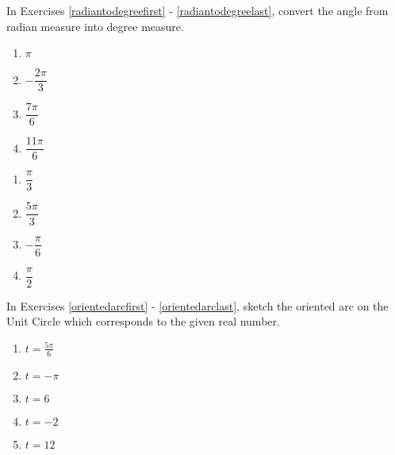 In Exercises \ref{radiantodegreefirst} - \ref{radiantodegreelast}, convert the angle from radian measure into degree measure.

\begin{multicols}{4} 

\begin{enumerate}

\setcounter{enumi}{\value{HW}}

\item $\pi$  \label{radiantodegreefirst}
\item $-\dfrac{2\pi}{3}$
\item $\dfrac{7\pi}{6}$
\item $\dfrac{11\pi}{6}$

\setcounter{HW}{\value{enumi}}

\end{enumerate}

\end{multicols}

\begin{multicols}{4} 

\begin{enumerate}

\setcounter{enumi}{\value{HW}}

\item $\dfrac{\pi}{3}$ 
\item $\dfrac{5\pi}{3}$
\item $-\dfrac{\pi}{6}$ 
\item $\dfrac{\pi}{2}$  \label{radiantodegreelast}

\setcounter{HW}{\value{enumi}}

\end{enumerate}

\end{multicols}


In Exercises \ref{orientedarcfirst} - \ref{orientedarclast}, sketch the oriented arc on the Unit Circle which  corresponds to the given real number. 

\begin{multicols}{5} 

\begin{enumerate}

\setcounter{enumi}{\value{HW}}

\item $t=\frac{5 \pi}{6}$ \label{orientedarcfirst}

\item $t=-\pi$

\item $t = 6$

\item  $t = -2$

\item  $t = 12$ \label{orientedarclast}

\setcounter{HW}{\value{enumi}}

\end{enumerate}

\end{multicols}

